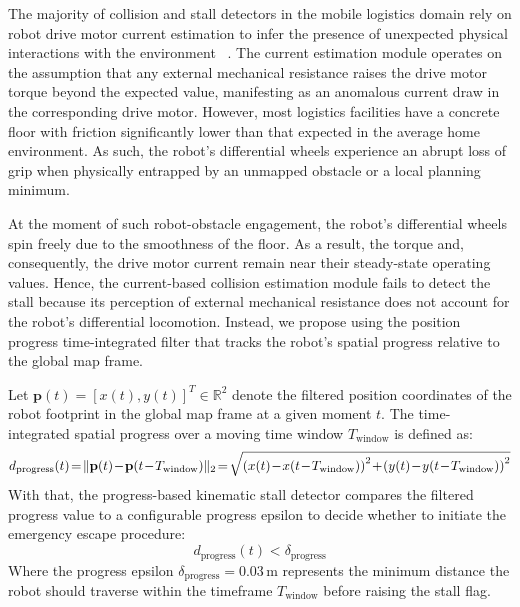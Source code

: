 The majority of collision and stall detectors in the mobile logistics domain rely on robot drive motor current estimation to infer the presence of unexpected physical interactions with the environment ~\cite{xiang2025servo}. The current estimation module operates on the assumption that any external mechanical resistance raises the drive motor torque beyond the expected value, manifesting as an anomalous current draw in the corresponding drive motor. However, most logistics facilities have a concrete floor with friction significantly lower than that expected in the average home environment. As such, the robot's differential wheels experience an abrupt loss of grip when physically entrapped by an unmapped obstacle or a local planning minimum.

At the moment of such robot-obstacle engagement, the robot's differential wheels spin freely due to the smoothness of the floor. As a result, the torque and, consequently, the drive motor current remain near their steady-state operating values. Hence, the current-based collision estimation module fails to detect the stall because its perception of external mechanical resistance does not account for the robot's differential locomotion. Instead, we propose using the position progress time-integrated filter that tracks the robot's spatial progress relative to the global map frame.

Let $\mathbf{p}(t) = [x(t), y(t)]^T \in \mathbb{R}^2$ denote the filtered position coordinates of the robot footprint in the global map frame at a given moment $t$. The time-integrated spatial progress over a moving time window $T_{\text{window}}$ is defined as:
\begin{equation}
\thinmuskip=1mu\medmuskip=1mu\thickmuskip=2mu
d_{\text{progress}}(t) = \|\mathbf{p}(t) - \mathbf{p}(t - T_{\text{window}})\|_2 = \sqrt{\left(x(t) - x(t - T_{\text{window}})\right)^2 + \left(y(t) - y(t - T_{\text{window}})\right)^2} \label{eq:spatial_progress_formula}
\end{equation}
With that, the progress-based kinematic stall detector compares the filtered progress value to a configurable progress epsilon to decide whether to initiate the emergency escape procedure:
\begin{equation} d_{\text{progress}}(t) < \delta_{\text{progress}} \label{eq:stall_trigger_condition} \end{equation}
Where the progress epsilon $\delta_{\text{progress}} = 0.03\,\text{m}$ represents the minimum distance the robot should traverse within the timeframe $T_{\text{window}}$ before raising the stall flag.

